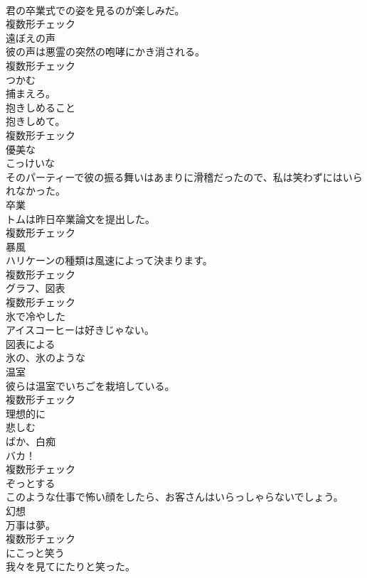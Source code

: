 \documentclass[8pt]{extreport}
\begin{document}
\begin{CJK}{UTF8}{min}
\\	君の卒業式での姿を見るのが楽しみだ。	
\\	複数形チェック
\\	[名詞]	遠ぼえの声	
\\	彼の声は悪霊の突然の咆哮にかき消される。	
\\	複数形チェック
\\	[動詞]	つかむ	
\\	捕まえろ。	
\\	[名詞]	抱きしめること	
\\	抱きしめて。	
\\	複数形チェック
\\	[形容詞]	優美な	
\\	[形容詞]	こっけいな	
\\	そのパーティーで彼の振る舞いはあまりに滑稽だったので、私は笑わずにはいられなかった。	
\\	[名詞]	卒業	
\\	トムは昨日卒業論文を提出した。	
\\	複数形チェック
\\	[名詞]	暴風	
\\	ハリケーンの種類は風速によって決まります。	
\\	複数形チェック
\\	[名詞]	グラフ、図表	
\\	複数形チェック
\\	[形容詞]	氷で冷やした	
\\	アイスコーヒーは好きじゃない。	
\\	[形容詞]	図表による	
\\	[形容詞]	氷の、氷のような	
\\	[名詞]	温室	
\\	彼らは温室でいちごを栽培している。	
\\	複数形チェック
\\	[副詞]	理想的に	
\\	[動詞]	悲しむ	
\\	[名詞]	ばか、白痴	
\\	バカ！	
\\	複数形チェック
\\	[形容詞]	ぞっとする	
\\	このような仕事で怖い顔をしたら、お客さんはいらっしゃらないでしょう。	
\\	[名詞]	幻想	
\\	万事は夢。	
\\	複数形チェック
\\	[動詞]	にこっと笑う	
\\	我々を見てにたりと笑った。	

\end{CJK}
\end{document}
